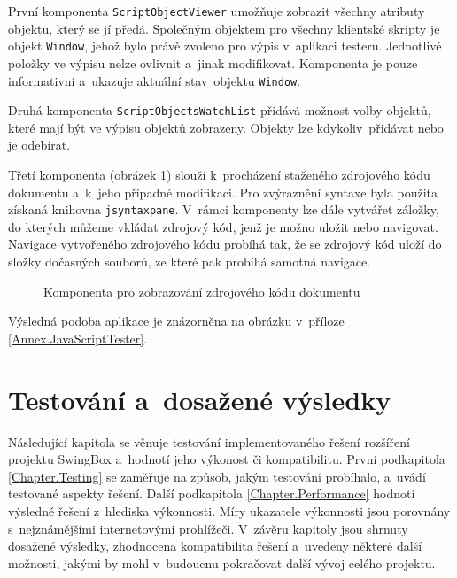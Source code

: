 \vspace{-1em}

První komponenta \texttt{ScriptObjectViewer} umožňuje zobrazit všechny atributy objektu, který se jí předá. Společným objektem pro všechny klientské skripty je objekt \texttt{Window}, jehož bylo právě zvoleno pro výpis v~aplikaci testeru. Jednotlivé položky ve výpisu nelze ovlivnit a~jinak modifikovat. Komponenta je pouze informativní a~ukazuje aktuální stav~objektu \texttt{Window}.

Druhá komponenta \texttt{ScriptObjectsWatchList} přidává možnost volby objektů, které mají být ve výpisu objektů zobrazeny. Objekty lze kdykoliv~přidávat nebo je odebírat.  

Třetí komponenta (obrázek \ref{Figure.SourceCodeComponent}) slouží k~procházení staženého zdrojového kódu dokumentu a~k~jeho případné modifikaci. Pro zvýraznění syntaxe byla použita získaná knihovna \texttt{jsyntaxpane}. V~rámci komponenty lze dále vytvářet záložky, do kterých můžeme vkládat zdrojový kód, jenž je možno uložit nebo navigovat. Navigace vytvořeného zdrojového kódu probíhá tak, že se zdrojový kód uloží do složky dočasných souborů, ze které pak probíhá samotná navigace. 

\begin{figure}[H]
  \begin{center}
    \caption{Komponenta pro zobrazování zdrojového kódu dokumentu}
    \label{Figure.SourceCodeComponent}
  \end{center}
\end{figure}

\vspace{-1em}

\noindent Výsledná podoba aplikace je znázorněna na obrázku v~příloze \ref{Annex.JavaScriptTester}.

\chapter{Testování a~dosažené výsledky}
\label{Chapter.TestingAndResults}

Následující kapitola se věnuje testování implementovaného řešení rozšíření projektu SwingBox a~hodnotí jeho výkonost či kompatibilitu. První podkapitola \ref{Chapter.Testing} se zaměřuje na způsob,  jakým testování probíhalo, a~uvádí testované aspekty řešení.  Další podkapitola \ref{Chapter.Performance} hodnotí výsledné řešení z~hlediska výkonnosti. Míry ukazatele výkonnosti jsou porovnány s~nejznámějšími internetovými prohlížeči. V~závěru kapitoly jsou shrnuty dosažené výsledky, zhodnocena kompatibilita řešení a~uvedeny některé další možnosti, jakými by mohl v~budoucnu pokračovat další vývoj celého projektu.

